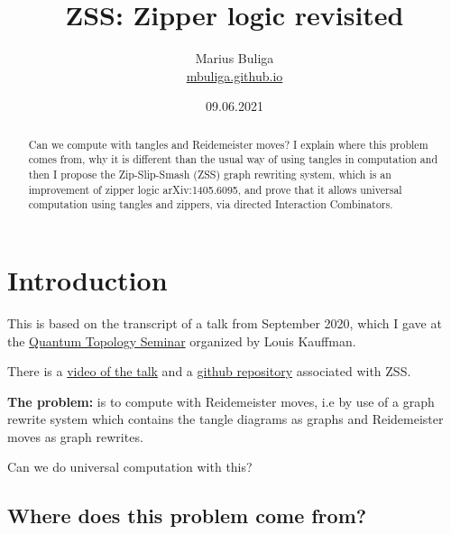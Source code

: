 \documentclass[]{article}
\begin{document}
\title{ZSS: Zipper logic revisited}

\author{Marius Buliga \\ \href{https://mbuliga.github.io}{mbuliga.github.io}}

\date{09.06.2021}

\maketitle

\begin{abstract}
Can we compute with tangles and Reidemeister moves? I explain where this problem comes from, why it is different than the usual way of using tangles in computation and then I propose the Zip-Slip-Smash (ZSS) graph rewriting system, which is  an improvement of zipper logic arXiv:1405.6095, and prove that it allows universal computation
using tangles and zippers, via directed Interaction Combinators.
\end{abstract}



\hypertarget{introduction}{%
\section{Introduction}\label{zss-zipper-logic-revisited}}



This is based on the transcript of a talk from September 2020, which I
gave at the
\href{https://www.dropbox.com/sh/5c3xihm2mkdo5s5/AADl_aRwAB3EfT2YpiLfCRZ-a?dl=0}{Quantum
Topology Seminar} organized by Louis Kauffman.

There is a
\href{https://www.dropbox.com/sh/5c3xihm2mkdo5s5/AABDoNpc6K4XioJqesIy6vdma/MariusBuliga?dl=0\&preview=zoom_0.mp4\&subfolder_nav_tracking=1}{video
of the talk} and a \href{https://github.com/mbuliga/zss}{github
repository} associated with ZSS.

\textbf{The problem:} is to compute with Reidemeister moves, i.e by use of a graph
rewrite system which contains the tangle diagrams as graphs and
Reidemeister moves as graph rewrites.

Can we do universal computation with this?

\hypertarget{where-does-this-problem-come-from}{%
\subsection{Where does this problem come
from?}\label{where-does-this-problem-come-from}}
\end{document}
